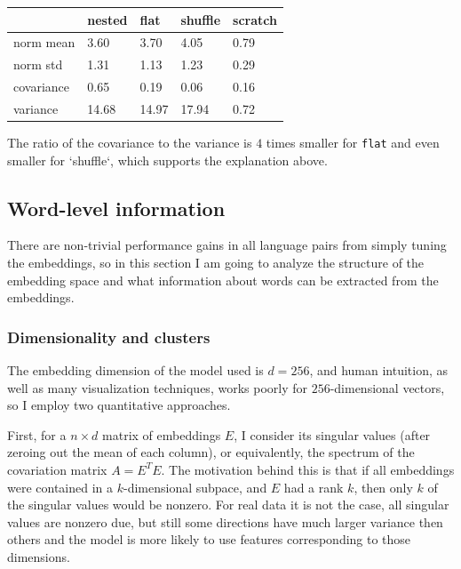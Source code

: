 \documentclass[a4paper, 11pt, oneside]{article}
\begin{document}
	\begin{table}[ht]
		\centering
		\begin{tabular}{|p{60pt}|p{40pt}|p{40pt}|p{40pt}|p{40pt}|}
			\hline
			           & \textbf{nested} & \textbf{flat} & \textbf{shuffle} & \textbf{scratch} \\
			\hline
			norm mean  & 3.60            & 3.70          & 4.05             & 0.79             \\
			\hline
			norm std   & 1.31            & 1.13          & 1.23             & 0.29             \\
			\hline
			covariance & 0.65            & 0.19          & 0.06             & 0.16             \\
			\hline
			variance   & 14.68           & 14.97         & 17.94            & 0.72             \\
			\hline
		\end{tabular}
	\end{table}

	The ratio of the covariance to the variance is $4$ times smaller for \texttt{flat}
	and even smaller for `shuffle`, which supports the explanation above.

	\subsection{Word-level information}
	There are non-trivial performance gains in all language pairs from simply
	tuning the embeddings, so in this section I am going to analyze the structure of
	the embedding space and what information about words can be extracted from the
	embeddings.

	\subsubsection{Dimensionality and clusters}

	The embedding dimension of the model used is $d = 256$, and human intuition,
	as well as many visualization techniques, works poorly for $256$-dimensional vectors,
	so I employ two quantitative approaches.

	First, for a $n \times d$ matrix of embeddings $E$, I consider its singular
	values (after zeroing out the mean of each column), or equivalently, the
	spectrum of the covariation matrix $A = E^{T} E$. The motivation behind this is
	that if all embeddings were contained in a $k$-dimensional subpace, and $E$
	had a rank $k$, then only $k$ of the singular values would be nonzero. For
	real data it is not the case, all singular values are nonzero due, but still
	some directions have much larger variance then others and the model is more
	likely to use features corresponding to those dimensions.
\end{document}
